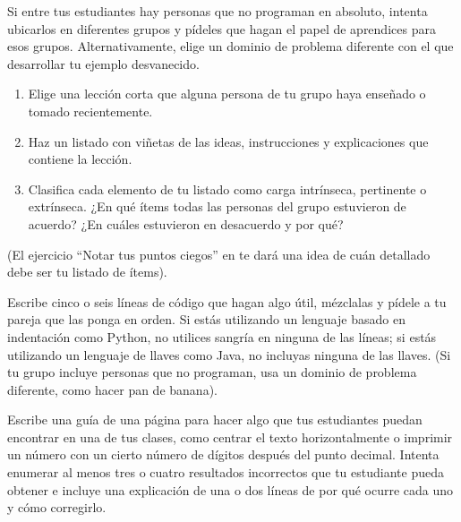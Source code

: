 Si entre tus estudiantes hay personas que no programan en absoluto,
intenta ubicarlos en diferentes grupos
y pídeles que hagan el papel de aprendices para esos grupos.
Alternativamente,
elige un dominio de problema diferente con el que desarrollar tu ejemplo desvanecido.



\begin{enumerate}

\item
  Elige una lección corta que alguna persona de tu grupo haya enseñado o tomado recientemente.

\item
  Haz un listado con viñetas de las ideas, instrucciones y explicaciones que contiene la lección.

\item
  Clasifica cada elemento de tu listado como carga intrínseca, pertinente o extrínseca.
  ¿En qué ítems todas las personas del grupo estuvieron de acuerdo?
  ¿En cuáles estuvieron en desacuerdo y por qué?

\end{enumerate}

(El ejercicio ``Notar tus puntos ciegos'' en 
te dará una idea de cuán detallado debe ser tu listado de ítems).



Escribe cinco o seis líneas de código que hagan algo útil,
mézclalas y pídele a tu pareja que las ponga en orden.
Si estás utilizando un lenguaje basado en indentación como Python,
no utilices sangría en ninguna de las líneas;
si estás utilizando un lenguaje de llaves como Java,
no incluyas ninguna de las llaves.
(Si tu grupo incluye personas que no programan,
usa un dominio de problema diferente,
como hacer pan de banana).



Escribe una guía de una página para hacer algo que tus estudiantes puedan encontrar en una de tus clases,
como centrar el texto horizontalmente
o imprimir un número con un cierto número de dígitos después del punto decimal.
Intenta enumerar al menos tres o cuatro resultados incorrectos que tu estudiante pueda obtener
e incluye una explicación de una o dos líneas
de por qué ocurre cada uno y cómo corregirlo.



